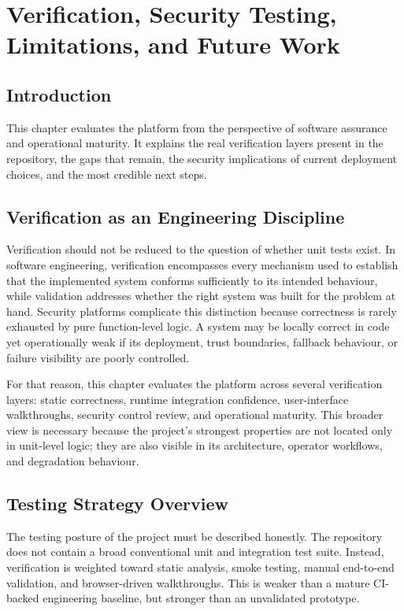 \chapter{Verification, Security Testing, Limitations, and Future Work}
\thispagestyle{plain}
\section*{Introduction}
This chapter evaluates the platform from the perspective of software assurance and operational maturity. It explains the real verification layers present in the repository, the gaps that remain, the security implications of current deployment choices, and the most credible next steps.

\section{Verification as an Engineering Discipline}
Verification should not be reduced to the question of whether unit tests exist. In software engineering, verification encompasses every mechanism used to establish that the implemented system conforms sufficiently to its intended behaviour, while validation addresses whether the right system was built for the problem at hand. Security platforms complicate this distinction because correctness is rarely exhausted by pure function-level logic. A system may be locally correct in code yet operationally weak if its deployment, trust boundaries, fallback behaviour, or failure visibility are poorly controlled.

For that reason, this chapter evaluates the platform across several verification layers: static correctness, runtime integration confidence, user-interface walkthroughs, security control review, and operational maturity. This broader view is necessary because the project's strongest properties are not located only in unit-level logic; they are also visible in its architecture, operator workflows, and degradation behaviour.

\section{Testing Strategy Overview}
The testing posture of the project must be described honestly. The repository does not contain a broad conventional unit and integration test suite. Instead, verification is weighted toward static analysis, smoke testing, manual end-to-end validation, and browser-driven walkthroughs. This is weaker than a mature CI-backed engineering baseline, but stronger than an unvalidated prototype.

